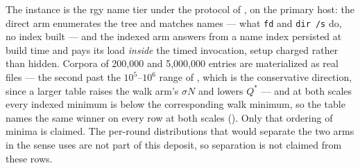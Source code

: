 \documentclass[11pt,letterpaper]{article}
\begin{document}
The instance is the rgy name tier under the protocol of ,
on the primary host: the direct arm enumerates the tree and matches
names --- what \texttt{fd} and \texttt{dir /s} do, no index built --- and
the indexed arm answers from a name index persisted at build time and
pays its load \emph{inside} the timed invocation, setup charged rather
than hidden. Corpora of 200{,}000 and 5{,}000{,}000 entries are
materialized as real files --- the second past the $10^5$--$10^6$ range
of , which is the conservative direction, since a larger
table raises the walk arm's $\sigma N$ and lowers $Q^{*}$ --- and at both
scales every indexed minimum is below the corresponding walk minimum, so the
table names the same winner on every row at both scales ().
Only that ordering of minima is claimed. The per-round distributions that would
separate the two arms in the sense  uses are not part of
this deposit, so separation is not claimed from these rows.
\end{document}
